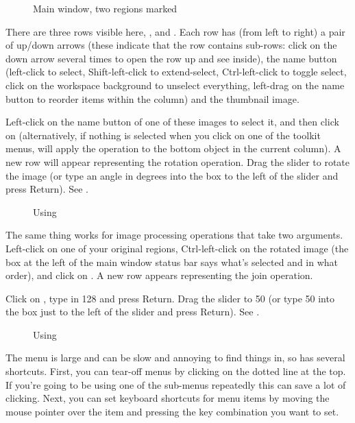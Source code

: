 \begin{figure}
\caption{Main window, two regions marked}
\end{figure}

There are three rows visible here, ,  and . Each row
has (from left to right) a pair of up/down arrows (these indicate that
the row contains sub-rows: click on the down arrow several times to
open the row up and see inside), the name button (left-click to select,
Shift-left-click to extend-select, Ctrl-left-click to toggle select, click
on the workspace background to unselect everything, left-drag on the name
button to reorder items within the column) and the thumbnail image.

Left-click on the name button of one of these images to select it, and
then click on 
(alternatively, if nothing is selected when you click on one of the toolkit
menus, \nip{} will apply the operation to the bottom object in the current
column). A new row will appear representing the rotation operation. Drag
the slider to rotate the image (or type an angle in degrees into the box
to the left of the slider and press Return). See .

\begin{figure}
\caption{Using }
\end{figure}

The same thing works for image processing operations that take two arguments.
Left-click on one of your original regions, Ctrl-left-click on the rotated
image (the box at the left of the main window status bar says what's selected
and in what order), and click on . A new row appears representing the join operation.

Click on , type in 128 and press Return. Drag the
 slider to 50 (or type 50 into the box just to the left of the
slider and press Return). See .

\begin{figure}
\caption{Using }
\end{figure}

The  menu is large and can be slow and annoying to find
things in, so \nip{} has several shortcuts. First, you can tear-off menus
by clicking on the dotted line at the top. If you're going to be using
one of the sub-menus repeatedly this can save a lot of clicking. Next,
you can set keyboard shortcuts for menu items by moving the mouse pointer
over the item and pressing the key combination you want to set. 

